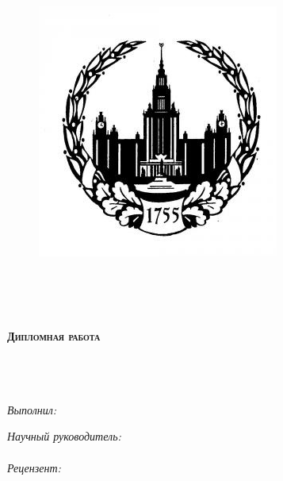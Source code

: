 \thispagestyle{empty}

\begin{center}

\begin{figure}
\centering
\includegraphics[width=0.2\linewidth]{msulogo.jpg} %
\end{figure}

\textsc{\LARGE \univname}\\[1.cm] %
\textsc{\large \facname}\\[1.cm] %
\textsc{\Large \depname}\\[1.cm] %

\vspace{20pt}

\textsc{\large \textbf{Дипломная работа}}\\[0.5cm] %

\HRule \\[0.4cm] %
{\huge \bfseries \ttitle}\\[0.4cm] %
\HRule \\[1.5cm] %
 
\begin{minipage}{0.4\textwidth}
\vspace{-80pt}
\begin{flushleft} \large
\emph{Выполнил:}\\
{\authornames} %
\end{flushleft}
\end{minipage}
\begin{minipage}{0.4\textwidth}
\begin{flushright} \large
\emph{Научный руководитель:} \\
{\supname} %
\\
\vspace{30pt}
\emph{Рецензент:} \\
{\revname} %
\end{flushright}
\end{minipage}\\[3cm]

\vspace{40pt}

{\large \mydate}\\[4cm] %
 
\vfill
\end{center}


